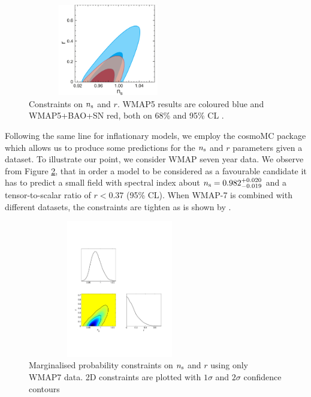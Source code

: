 \documentclass{rmaa}
\begin{document}
\begin{figure}[h!]
\begin{center}
 \includegraphics[trim = 1mm 10mm -10mm -3mm, clip, width=7cm, height=4cm]{komatsu1.pdf}
\caption{Constraints on $n_{\rm s}$ and $r$.
WMAP5 results are coloured blue and WMAP5+BAO+SN red, both on 68\% and 95\% CL \citep{Komatsu}.
}\label{fig:Komatsu}
\end{center}
\end{figure}

Following the same line for inflationary models, we employ the {\sc cosmoMC} package \citep{Lewis}
which allows us to produce some predictions for the $n_{\rm s}$ and $r$ parameters given 
a dataset. To illustrate our point, we consider WMAP seven year data. 
We observe from Figure \ref{fig:infla}, that in order a 
model to be considered as a favourable candidate 
it has to predict a small field with spectral index about  $n_{\rm s}=0.982^{+0.020}_{-0.019}$ 
 and a tensor-to-scalar ratio of $r<0.37$ (95\% CL).
When WMAP-7 is combined with different datasets, the constraints are tighten as is 
shown by \citep{Larson}. 

\begin{figure}[h!]
\begin{center}
 \includegraphics[trim = 10mm 50mm 20mm 40mm, clip, width=8cm, height=6cm]{infla_wmap7.pdf}
\caption{Marginalised probability constraints on $n_{\rm s}$ and $r$ using only WMAP7 data. 
2D constraints are plotted with $1\sigma$ and
$2\sigma$ confidence contours
}\label{fig:infla}
\end{center}
\end{figure}	
\end{document}
